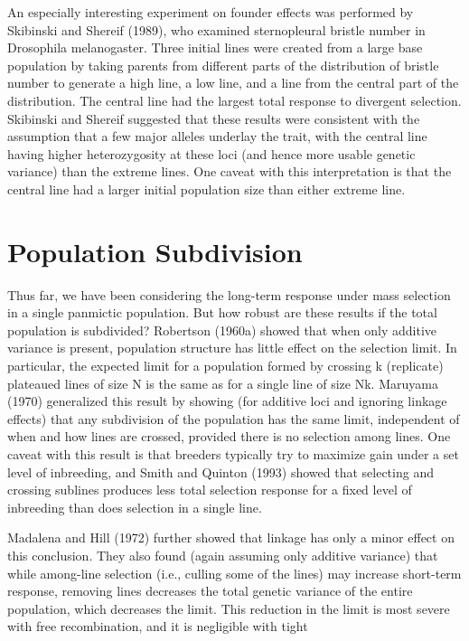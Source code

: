 \documentclass{article}
\begin{document}
{An especially interesting experiment on founder effects was performed by Skibinski and Shereif (1989), who examined sternopleural bristle number in Drosophila melanogaster. Three initial lines were created from a large base population by taking parents from different parts of the distribution of bristle number to generate a high line, a low line, and a line from the central part of the distribution. The central line had the largest total response to divergent selection. Skibinski and Shereif suggested that these results were consistent with the assumption that a few major alleles underlay the trait, with the central line having higher heterozygosity at these loci (and hence more usable genetic variance) than the extreme lines. One caveat with this interpretation is that the central line had a larger initial population size than either extreme line.

\section{Population Subdivision}
Thus far, we have been considering the long-term response under mass selection in a single panmictic population. But how robust are these results if the total population is subdivided? Robertson (1960a) showed that when only additive variance is present, population structure has little effect on the selection limit. In particular, the expected limit for a population formed by crossing k (replicate) plateaued lines of size N is the same as for a single line of size Nk. Maruyama (1970) generalized this result by showing (for additive loci and ignoring linkage effects) that any subdivision of the population has the same limit, independent of when and how lines are crossed, provided there is no selection among lines. One caveat with this result is that breeders typically try to maximize gain under a set level of inbreeding, and Smith and Quinton (1993) showed that selecting and crossing sublines produces less total selection response for a fixed level of inbreeding than does selection in a single line.

Madalena and Hill (1972) further showed that linkage has only a minor effect on this conclusion. They also found (again assuming only additive variance) that while among-line selection (i.e., culling some of the lines) may increase short-term response, removing lines decreases the total genetic variance of the entire population, which decreases the limit. This reduction in the limit is most severe with free recombination, and it is negligible with tight

}
\end{document}
